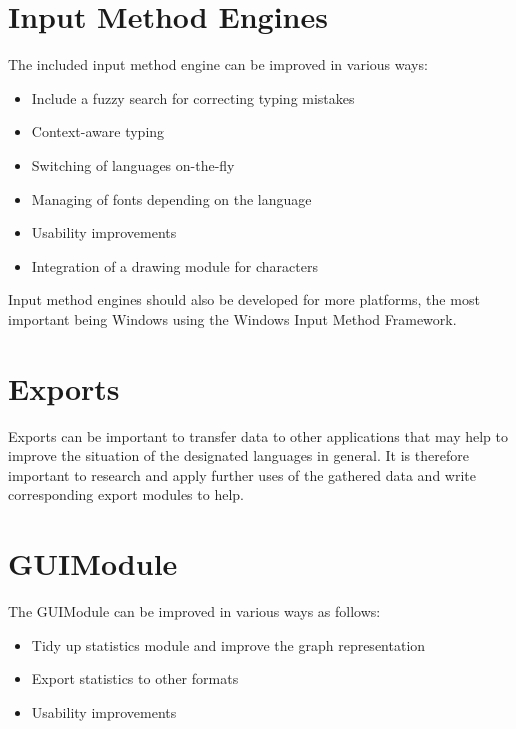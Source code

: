 \documentclass[10pt,a4paper,titlepage]{report}
\begin{document}
	\section{Input Method Engines}
	The included input method engine can be improved in various ways:
	\begin{itemize}
		\item Include a fuzzy search for correcting typing mistakes
		\item Context-aware typing
		\item Switching of languages on-the-fly
		\item Managing of fonts depending on the language
		\item Usability improvements
		\item Integration of a drawing module for characters
	\end{itemize}
	Input method engines should also be developed for more platforms, the most important being Windows using the Windows Input Method Framework.
	\section{Exports}
	Exports can be important to transfer data to other applications that may help to improve the situation of the designated languages in general. It is therefore important to research and apply further uses of the gathered data and write corresponding export modules to help.
	\section{GUIModule}
	The GUIModule can be improved in various ways as follows:
	\begin{itemize}
		\item Tidy up statistics module and improve the graph representation
		\item Export statistics to other formats
		\item Usability improvements
	\end{itemize}
\end{document}

